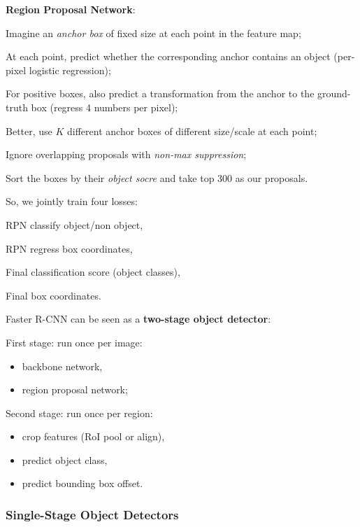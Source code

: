 \textbf{Region Proposal Network}:
\begin{myenum}
    \item Imagine an \textit{anchor box} of fixed size at each point in the feature map;
    \item At each point, predict whether the corresponding anchor contains an object (per-pixel logistic regression);
    \item For positive boxes, also predict a transformation from the anchor to the ground-truth box (regress 4 numbers per pixel);
    \item Better, use $K$ different anchor boxes of different size/scale at each point;
    \item Ignore overlapping proposals with \textit{non-max suppression};
    \item Sort the boxes by their \textit{object socre} and take top 300 as our proposals.
\end{myenum}

So, we jointly train four losses:
\begin{myenum}
    \item RPN classify object/non object,
    \item RPN regress box coordinates,
    \item Final classification score (object classes),
    \item Final box coordinates.
\end{myenum}

Faster R-CNN can be seen as a \textbf{two-stage object detector}:
\begin{myitem}
    \item First stage: run once per image:
    \begin{itemize}
        \item backbone network,
        \item region proposal network;
    \end{itemize}
    \item Second stage: run once per region:
    \begin{itemize}
        \item crop features (RoI pool or align),
        \item predict object class,
        \item predict bounding box offset.
    \end{itemize}
\end{myitem}


\subsubsection{Single-Stage Object Detectors}\label{sec:ds-detection-single-stage}

